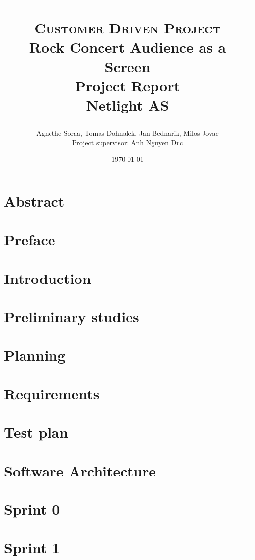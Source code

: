 \documentclass{report}
\title{
	\hrule
    \normalsize \textsc{Customer Driven Project}\\
    \Huge Rock Concert Audience as a Screen\\[10pt]
    \normalsize Project Report\\[10pt]
    Netlight AS
    \horrule{2pt}
    }
\author{Agnethe Soraa,
Tomas Dohnalek,
Jan Bednarik,
Milos Jovac \\
\normalsize Project supervisor: Anh Nguyen Duc}
\date{\today}
\begin{document}
\maketitle
\chapter*{Abstract}


\chapter*{Preface}


\tableofcontents
\setcounter{page}{3}

\chapter{Introduction}


\chapter{Preliminary studies}


\chapter{Planning}


\chapter{Requirements}


\chapter{Test plan}


\chapter{Software Architecture}


\chapter{Sprint 0}


\chapter{Sprint 1}

\end{document}
